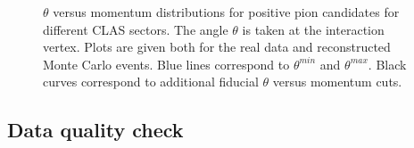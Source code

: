 \begin{figure}[htp]
\begin{center}
\caption{\small $\theta$ versus momentum distributions for positive pion candidates for different CLAS sectors. The angle $\theta$ is taken at the interaction vertex. Plots are given both for the real data and reconstructed Monte Carlo events. Blue lines correspond to $\theta^{min}$ and $\theta^{max}$. Black curves correspond to additional fiducial $\theta$ versus momentum cuts. \label{fig:th_vs_p_pip}}
\end{center}
\end{figure}

\clearpage

\subsection{Data quality check}
\label{Sect:qcheck}
\afterpage{\clearpage}

